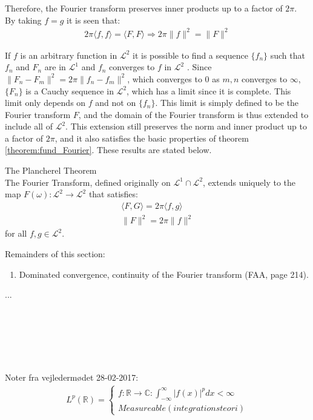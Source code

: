 Therefore, the Fourier transform preserves inner products up to a factor of $2\pi$. By taking $f = g$ it is seen that:
\begin{align*}
2\pi \langle f,f \rangle = \langle F,F \rangle \Rightarrow 2\pi \|f\|^2 = \|F\|^2
\end{align*}

If $f$ is an arbitrary function in $\mathcal{L}^2$ it is possible to find a sequence $\{f_n\}$ such that $f_n$ and $F_n$ are in $\mathcal{L}^1$ and $f_n$ converges to $f$ in $\mathcal{L}^2$ \cite{page 82, FAA}. Since $\|F_n - F_m\|^2 = 2\pi\|f_n - f_m\|^2$, which converges to 0 as $m,n$ converges to $\infty$, $\{F_n\}$ is a Cauchy sequence in $\mathcal{L}^2$, which has a limit since it is complete. This limit only depends on $f$ and not on $\{f_n\}$. This limit is simply defined to be the Fourier transform $F$, and the domain of the Fourier transform is thus extended to include all of $\mathcal{L}^2$. This extension still preserves the norm and inner product up to a factor of $2\pi$, and it also satisfies the basic properties of theorem \ref{theorem:fund_Fourier}. These results are stated below.

\begin{theorem}{The Plancherel Theorem} \label{Plancherel}
\\
The Fourier Transform, defined originally on $\mathcal{L}^1 \cap \mathcal{L}^2$, extends uniquely to the map $F(\omega): \mathcal{L}^2 \to \mathcal{L}^2$ that satisfies:
\begin{align*}
\langle F, G \rangle = 2\pi \langle f,g \rangle \\
\|F\|^2  = 2\pi \|f\|^2
\end{align*}
for all $f,g \in \mathcal{L}^2$.
\end{theorem}

Remainders of this section:
\begin{enumerate}
\item Dominated convergence, continuity of the Fourier transform (FAA, page 214).
\end{enumerate}
...
\\ \\ \\ \\ \\ \\ \\
Noter fra vejledermødet 28-02-2017:
\begin{align*}
L^p(\mathbb{R}) =
\left\{\begin{matrix}
f : \mathbb{R} \to \mathbb{C}: \int_{-\infty}^\infty |f(x)|^p dx < \infty \\
Measureable (integrationsteori)
\end{matrix}\right.
\end{align*}

